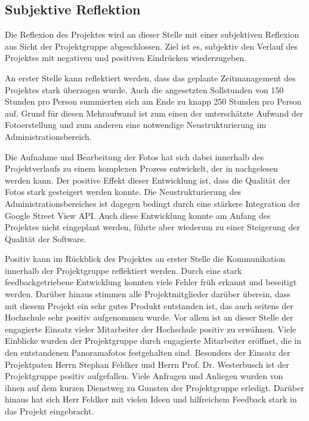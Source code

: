 \subsection{Subjektive Reflektion}
\label{sec:SubjektiveReflekion}

Die Reflexion des Projektes wird an dieser Stelle mit 
einer subjektiven Reflexion aus Sicht der Projektgruppe abgeschlossen. Ziel ist
es, subjektiv den Verlauf des Projektes mit negativen und positiven Eindrücken
wiederzugeben.

An erster Stelle kann reflektiert werden, dass das geplante Zeitmanagement
des Projektes stark überzogen wurde. Auch die angesetzten Sollstunden von
150 Stunden pro Person summierten sich am Ende zu knapp 250 Stunden pro Person auf.
Grund für diesen Mehraufwand ist zum einen der unterschätzte Aufwand der 
Fotoerstellung und zum anderen eine notwendige Neustrukturierung im 
Administrationsbereich.

Die Aufnahme und Bearbeitung der Fotos hat sich dabei innerhalb des
Projektverlaufs zu einem komplexen Prozess entwickelt, der in
\citet{modelierungUndBetrieb2014} nachgelesen werden kann. Der
positive Effekt dieser Entwicklung ist, dass die
Qualität der Fotos stark gesteigert werden konnte.
Die Neustrukturierung des Administrationsbereiches ist dagegen bedingt durch eine stärkere
Integration der Google Street View API. Auch diese Entwicklung konnte am Anfang des Projektes
nicht eingeplant werden, führte aber wiederum zu einer Steigerung der Qualität der Software.

Positiv kann im Rückblick des Projektes an erster Stelle die Kommunikation
innerhalb der Projektgruppe reflektiert werden. Durch eine stark feedbackgetriebene
Entwicklung konnten viele Fehler früh erkannt und beseitigt werden.
Darüber hinaus stimmen alle Projektmitglieder darüber überein, dass mit diesem
Projekt ein sehr gutes Produkt entstanden ist, das auch seitens der Hochschule
sehr positiv aufgenommen wurde. Vor allem ist an dieser Stelle der engagierte Einsatz
vieler Mitarbeiter der Hochschule positiv zu erwähnen. Viele Einblicke wurden der
Projektgruppe durch engagierte Mitarbeiter eröffnet, die in den entstandenen Panoramafotos festgehalten sind.
Besonders der Einsatz der Projektpaten Herrn Stephan Feldker und Herrn Prof. Dr. Westerbusch 
ist der Projektgruppe positiv aufgefallen.
Viele Anfragen und Anliegen wurden von ihnen auf dem kurzen Dienstweg zu Gunsten der Projektgruppe
erledigt. Darüber hinaus hat sich Herr Feldker mit vielen Ideen und hilfreichem Feedback stark in das Projekt
eingebracht.